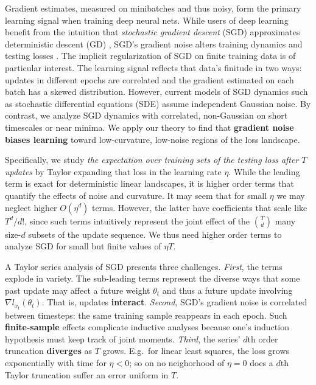   Gradient estimates, measured on minibatches and thus noisy, form the primary
learning signal when training deep neural nets.  While users of deep learning
benefit from the intuition that \emph{stochastic gradient descent} (SGD)
approximates deterministic descent (GD) \citep{bo91,le15}, SGD's gradient noise
alters training dynamics and testing losses \citep{go18,wu20}.
%
The implicit regularization of SGD on finite training data is of particular
interest.  The learning signal reflects that data's finitude in two
ways: updates in different epochs are correlated and the gradient estimated on
each batch has a skewed distribution.
%
%
However, current models of SGD dynamics such as stochastic differential
equations (SDE) assume independent Gaussian noise.
%
By contrast, we analyze SGD dynamics with correlated, non-Gaussian on short
timescales or near minima.  We apply our theory to find that \textbf{gradient
noise biases learning} toward low-curvature, low-noise regions of the loss
landscape.

  Specifically, we study \emph{the expectation over training sets of the
testing loss after $T$ updates} by Taylor expanding that loss in the learning
rate $\eta$.  While the leading term is exact for deterministic linear
landscapes, it is higher order terms that quantify the effects of noise and
curvature.
%
It may seem that for small $\eta$ we may neglect higher $O(\eta^d)$ terms.
However, the latter have coefficients that scale like $T^d/d!$, since such
terms intuitively represent the joint effect of the ${T\choose d}$ many
size-$d$ subsets of the %
update sequence.   We thus need higher order
terms to analyze SGD for small but finite values of $\eta T$.  


  A Taylor series analysis of SGD presents three challenges.
%
\emph{First}, the terms explode in variety.  The sub-leading terms
represent the diverse ways that some past update may affect a future
weight $\theta_t$ and thus a future update involving $\nabla
l_{x_t}(\theta_t)$.  That is, updates \textbf{interact}.
%
\emph{Second}, SGD's gradient noise is correlated between timesteps: the same
training sample reappears in each epoch.  Such \textbf{finite-sample} effects
complicate inductive analyses because one's induction hypothesis must keep
track of joint moments.%
%
\emph{Third}, the series' $d$th order truncation \textbf{diverges} as $T$
grows.  E.g.\ for linear least squares, the loss
grows exponentially with time for $\eta<0$; so on no neighorhood of $\eta=0$
does a $d$th Taylor truncation suffer an error uniform in $T$. 

